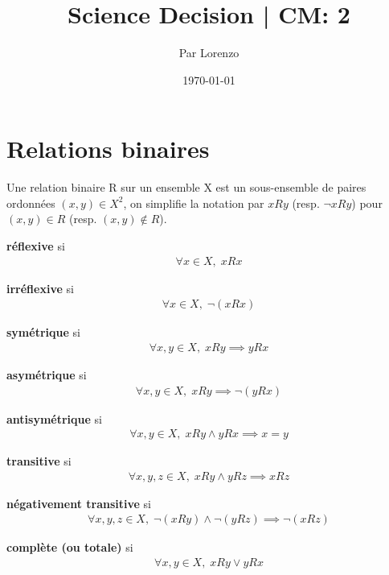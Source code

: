 \documentclass[a4paper, 12pt]{article}
\title{Science Decision | CM: 2}
\author{Par Lorenzo}
\date{\today}
\begin{document}
\maketitle


\section{Relations binaires}

\begin{definition}
    Une relation binaire R sur un ensemble X est un sous-ensemble de paires ordonnées $(x, y) \in X^2$,
    on simplifie la notation par $xRy$ (resp. $\neg xRy$) pour $(x, y) \in R$ (resp. $(x, y) \notin R$).
\end{definition}

\vspace{1em}

\begin{proprietes}
\item {
    \textbf{réflexive} si
    \begin{align*}
        \forall x \in X, \; xRx
    \end{align*}
}
\item {
    \textbf{irréflexive} si
    \begin{align*}
        \forall x \in X, \; \neg(xRx)
    \end{align*}
}
\item {
    \textbf{symétrique} si
    \begin{align*}
        \forall x, y \in X, \; xRy \implies yRx
    \end{align*}
}
\item {
    \textbf{asymétrique} si
    \begin{align*}
        \forall x, y \in X, \; xRy \implies \neg(yRx)
    \end{align*}
}
\item {
    \textbf{antisymétrique} si
    \begin{align*}
        \forall x, y \in X, \; xRy \land yRx \implies x = y
    \end{align*}
}
\item {
    \textbf{transitive} si
    \begin{align*}
        \forall x, y, z \in X, \; xRy \land yRz \implies xRz
    \end{align*}
}
\item {
    \textbf{négativement transitive} si
    \begin{align*}
        \forall x, y, z \in X, \; \neg(xRy) \land \neg(yRz) \implies \neg(xRz)
    \end{align*}
}\item {
    \textbf{complète (ou totale)} si
    \begin{align*}
        \forall x, y \in X, \; xRy \lor yRx
    \end{align*}
}
\end{proprietes}
\end{document}
